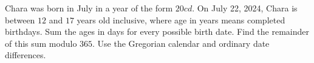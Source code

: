 Chara was born in July in a year of the form $20cd$. On July 22, 2024, Chara is between $12$ and $17$ years old inclusive, where age in years means completed birthdays. Sum the ages in days for every possible birth date. Find the remainder of this sum modulo $365$. Use the Gregorian calendar and ordinary date differences.
